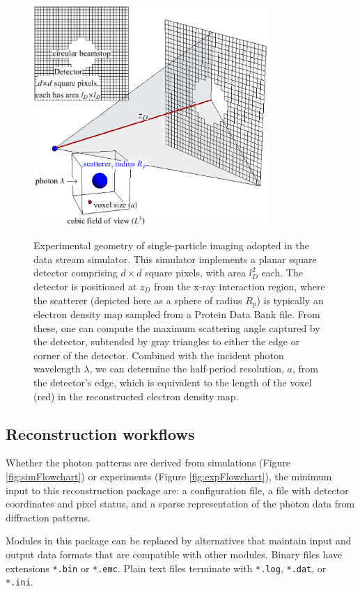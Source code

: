 \documentclass[preprint]{iucr}              %
\begin{document}
\begin{figure}
\caption{Experimental geometry of single-particle imaging adopted in the data stream simulator. This simulator implements a planar square detector comprising $d\times d$ square pixels, with area $l_D^2$ each. The detector is positioned at $z_D$ from the x-ray interaction region, where the scatterer (depicted here as a sphere of radius $R_p$) is typically an electron density map sampled from a Protein Data Bank file. From these, one can compute the maximum scattering angle captured by the detector, subtended by gray triangles to either the edge or corner of the detector. Combined with the incident photon wavelength $\lambda$,  we can determine the half-period resolution, $a$, from the detector's edge, which is equivalent to the length of the voxel (red) in the reconstructed electron density map.}
\includegraphics[width=3.5in]{figures/geometry.eps} \label{fig:expGeometry}
\end{figure}

\subsection{Reconstruction workflows}\label{sec:dataStreamSim}

Whether the photon patterns are derived from simulations (Figure \ref{fig:simFlowchart}) or experiments (Figure \ref{fig:expFlowchart}), the minimum input to this reconstruction package are: a configuration file, a file with detector coordinates and pixel status, and a sparse representation of the photon data from diffraction patterns. 

Modules in this package can be replaced by alternatives that maintain input and output data formats that are compatible with other modules. Binary files have extensions \texttt{*.bin} or \texttt{*.emc}. Plain text files terminate with \texttt{*.log}, \texttt{*.dat}, or \texttt{*.ini}.
\end{document}

